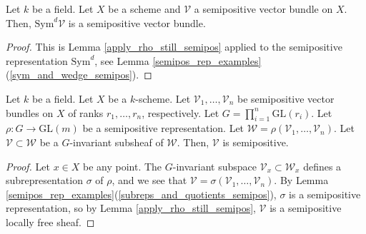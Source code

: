 \begin{lemma}\label{symd_semipos}
Let $k$ be a field.
Let $X$ be a scheme and $\mathcal{V}$ a semipositive vector bundle on $X$. 
Then, $\mathrm{Sym}^d\mathcal{V}$ is a semipositive vector bundle.
\end{lemma}
\begin{proof}
This is Lemma \ref{apply_rho_still_semipos} applied to the semipositive representation $\mathrm{Sym}^d$, see Lemma \ref{semipos_rep_examples}(\ref{sym_and_wedge_semipos}).
\end{proof}


\begin{lemma}
Let $k$ be a field.
Let $X$ be a $k$-scheme.
Let $\mathcal{V}_1,\ldots,\mathcal{V}_n$ be semipositive vector bundles on $X$ of ranks $r_1,\ldots,r_n$, respectively. 
Let $G=\prod_{i=1}^{n}\mathrm{GL}(r_i)$.
Let $\rho:G\to \mathrm{GL}(m)$ be a semipositive representation.
Let $\mathcal{W}=\rho(\mathcal{V}_1,\ldots,\mathcal{V}_n)$.
Let $\mathcal{V}\subset\mathcal{W}$ be a $G$-invariant subsheaf of $\mathcal{W}$.
Then, $\mathcal{V}$ is semipositive.
\end{lemma}

\begin{proof}
Let $x\in X$ be any point.
The $G$-invariant subspace $\mathcal{V}_x\subset\mathcal{W}_x$ defines a subrepresentation $\sigma$ of $\rho$, and we see that $\mathcal{V}=\sigma(\mathcal{V}_1,\ldots,\mathcal{V}_n)$.
By Lemma \ref{semipos_rep_examples}(\ref{subreps_and_quotients_semipos}), $\sigma$ is a semipositive representation, so by Lemma \ref{apply_rho_still_semipos}, $\mathcal{V}$ is a semipositive locally free sheaf.
\end{proof}







